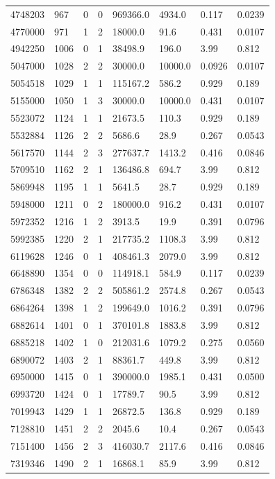 \documentclass[preview]{standalone}
\begin{document}
{{{\begin{tabular}{L{1.2cm}C{1.2cm} C{0.3cm}C{0.5cm} C{1.4cm}C{1.4cm} C{1.4cm}C{1.4cm}}
  4748203  &   967  & 0     &  0 &  969366.0  & 4934.0  & 0.117 &  0.0239   \\ 
  4770000  &   971  & 1     &  2 &  18000.0  & 91.6  & 0.431 &  0.0107   \\ 
  4942250  &  1006  & 0     &  1 &  38498.9  & 196.0  & 3.99 &  0.812   \\ 
  5047000  &  1028  & 2     &  2 &  30000.0  & 10000.0  & 0.0926 &  0.0107   \\ 
  5054518  &  1029  & 1     &  1 &  115167.2  & 586.2  & 0.929 &  0.189   \\ 
  5155000  &  1050  & 1     &  3 &  30000.0  & 10000.0  & 0.431 &  0.0107   \\ 
  5523072  &  1124  & 1     &  1 &  21673.5  & 110.3  & 0.929 &  0.189   \\ 
  5532884  &  1126  & 2     &  2 &  5686.6  & 28.9  & 0.267 &  0.0543   \\ 
  5617570  &  1144  & 2     &  3 &  277637.7  & 1413.2  & 0.416 &  0.0846   \\ 
  5709510  &  1162  & 2     &  1 &  136486.8  & 694.7  & 3.99 &  0.812   \\ 
  5869948  &  1195  & 1     &  1 &  5641.5  & 28.7  & 0.929 &  0.189   \\ 
  5948000  &  1211  & 0     &  2 &  180000.0  & 916.2  & 0.431 &  0.0107   \\ 
  5972352  &  1216  & 1     &  2 &  3913.5  & 19.9  & 0.391 &  0.0796   \\ 
  5992385  &  1220  & 2     &  1 &  217735.2  & 1108.3  & 3.99 &  0.812   \\ 
  6119628  &  1246  & 0     &  1 &  408461.3  & 2079.0  & 3.99 &  0.812   \\ 
  6648890  &  1354  & 0     &  0 &  114918.1  & 584.9  & 0.117 &  0.0239   \\ 
  6786348  &  1382  & 2     &  2 &  505861.2  & 2574.8  & 0.267 &  0.0543   \\ 
  6864264  &  1398  & 1     &  2 &  199649.0  & 1016.2  & 0.391 &  0.0796   \\ 
  6882614  &  1401  & 0     &  1 &  370101.8  & 1883.8  & 3.99 &  0.812   \\ 
  6885218  &  1402  & 1     &  0 &  212031.6  & 1079.2  & 0.275 &  0.0560   \\ 
  6890072  &  1403  & 2     &  1 &  88361.7  & 449.8  & 3.99 &  0.812   \\ 
  6950000  &  1415  & 0     &  1 &  390000.0  & 1985.1  & 0.431 &  0.0500   \\ 
  6993720  &  1424  & 0     &  1 &  17789.7  & 90.5  & 3.99 &  0.812   \\ 
  7019943  &  1429  & 1     &  1 &  26872.5  & 136.8  & 0.929 &  0.189   \\ 
  7128810  &  1451  & 2     &  2 &  2045.6  & 10.4  & 0.267 &  0.0543   \\ 
  7151400  &  1456  & 2     &  3 &  416030.7  & 2117.6  & 0.416 &  0.0846   \\ 
  7319346  &  1490  & 2     &  1 &  16868.1  & 85.9  & 3.99 &  0.812   \\ 
\hline 
\end{tabular} 

}}}
\end{document}
